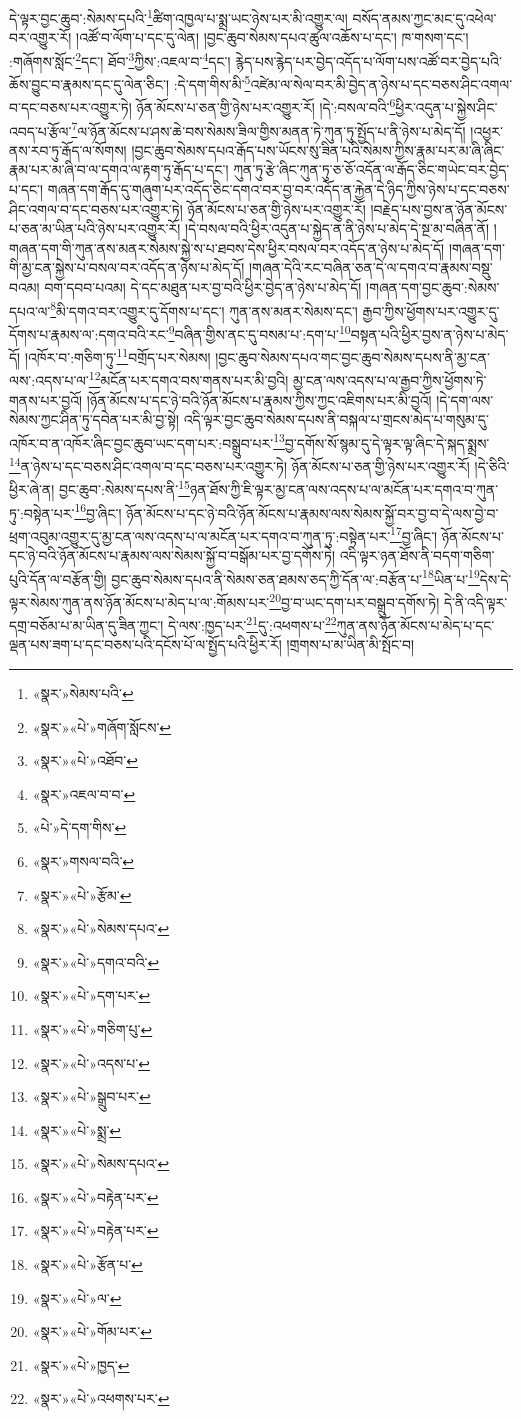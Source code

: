 དེ་ལྟར་བྱང་ཆུབ་:སེམས་དཔའི་\footnote{«སྣར་»སེམས་པའི་}ཚིག་འཁྱལ་པ་སྨྲ་ཡང་ཉེས་པར་མི་འགྱུར་ལ། བསོད་ནམས་ཀྱང་མང་དུ་འཕེལ་བར་འགྱུར་རོ། །འཚོ་བ་ལོག་པ་དང་དུ་ལེན། །བྱང་ཆུབ་སེམས་དཔའ་ཚུལ་འཆོས་པ་དང་། ཁ་གསག་དང་། :གཞོགས་སློང་\footnote{«སྣར་»«པེ་»གཞོག་སློངས་}དང་། ཐོབ་\footnote{«སྣར་»«པེ་»འཐོབ་}ཀྱིས་:འཇལ་བ་\footnote{«སྣར་»འཇལ་བ་བ་}དང་། རྙེད་པས་རྙེད་པར་བྱེད་འདོད་པ་ལོག་པས་འཚོ་བར་བྱེད་པའི་ཆོས་བྱུང་བ་རྣམས་དང་དུ་ལེན་ཅིང་། :དེ་དག་གིས་མི་\footnote{«པེ་»དེ་དག་གིས་}འཛེམ་ལ་སེལ་བར་མི་བྱེད་ན་ཉེས་པ་དང་བཅས་ཤིང་འགལ་བ་དང་བཅས་པར་འགྱུར་ཏེ། ཉོན་མོངས་པ་ཅན་གྱི་ཉེས་པར་འགྱུར་རོ། །དེ་:བསལ་བའི་\footnote{«སྣར་»གསལ་བའི་}ཕྱིར་འདུན་པ་སྐྱེས་ཤིང་འབད་པ་རྩོལ་\footnote{«སྣར་»«པེ་»རྩོམ་}ལ་ཉོན་མོངས་པ་ཤས་ཆེ་བས་སེམས་ཟིལ་གྱིས་མནན་ཏེ་ཀུན་ཏུ་སྤྱོད་པ་ནི་ཉེས་པ་མེད་དོ། །འཕྱར་ནས་རབ་ཏུ་རྒོད་ལ་སོགས། །བྱང་ཆུབ་སེམས་དཔའ་རྒོད་པས་ཡོངས་སུ་ཟིན་པའི་སེམས་ཀྱིས་རྣམ་པར་མ་ཞི་ཞིང་རྣམ་པར་མ་ཞི་བ་ལ་དགའ་ལ་རྟག་ཏུ་རྒོད་པ་དང་། ཀུན་ཏུ་རྩེ་ཞིང་ཀུན་ཏུ་ཅ་ཅོ་འདོན་ལ་རྒོད་ཅིང་གཡེང་བར་བྱེད་པ་དང་། གཞན་དག་རྒོད་དུ་གཞུག་པར་འདོད་ཅིང་དགའ་བར་བྱ་བར་འདོད་ན་རྐྱེན་དེ་ཉིད་ཀྱིས་ཉེས་པ་དང་བཅས་ཤིང་འགལ་བ་དང་བཅས་པར་འགྱུར་ཏེ། ཉོན་མོངས་པ་ཅན་གྱི་ཉེས་པར་འགྱུར་རོ། །བརྗེད་པས་བྱས་ན་ཉོན་མོངས་པ་ཅན་མ་ཡིན་པའི་ཉེས་པར་འགྱུར་རོ། །དེ་བསལ་བའི་ཕྱིར་འདུན་པ་སྐྱེད་ན་ནི་ཉེས་པ་མེད་དེ་སྔ་མ་བཞིན་ནོ། །གཞན་དག་གི་ཀུན་ནས་མནར་སེམས་སྐྱེ་ས་པ་ཐབས་དེས་ཕྱིར་བསལ་བར་འདོད་ན་ཉེས་པ་མེད་དོ། །གཞན་དག་གི་མྱ་ངན་སྐྱེས་པ་བསལ་བར་འདོད་ན་ཉེས་པ་མེད་དོ། །གཞན་དེའི་རང་བཞིན་ཅན་དེ་ལ་དགའ་བ་རྣམས་བསྡུ་བའམ། བག་དབབ་པའམ། དེ་དང་མཐུན་པར་བྱ་བའི་ཕྱིར་བྱེད་ན་ཉེས་པ་མེད་དོ། །གཞན་དག་བྱང་ཆུབ་:སེམས་དཔའ་ལ་\footnote{«སྣར་»«པེ་»སེམས་དཔའ་}མི་དགའ་བར་འགྱུར་དུ་དོགས་པ་དང་། ཀུན་ནས་མནར་སེམས་དང་། རྒྱབ་ཀྱིས་ཕྱོགས་པར་འགྱུར་དུ་དོགས་པ་རྣམས་ལ་:དགའ་བའི་རང་\footnote{«སྣར་»«པེ་»དགའ་བའི་}བཞིན་གྱིས་ནང་དུ་བསམ་པ་:དག་པ་\footnote{«སྣར་»«པེ་»དག་པར་}བསྟན་པའི་ཕྱིར་བྱས་ན་ཉེས་པ་མེད་དོ། །འཁོར་བ་:གཅིག་ཏུ་\footnote{«སྣར་»«པེ་»གཅིག་པུ་}བགྲོད་པར་སེམས། །བྱང་ཆུབ་སེམས་དཔའ་གང་བྱང་ཆུབ་སེམས་དཔས་ནི་མྱ་ངན་ལས་:འདས་པ་ལ་\footnote{«སྣར་»«པེ་»འདས་པ་}མངོན་པར་དགའ་བས་གནས་པར་མི་བྱའི། མྱ་ངན་ལས་འདས་པ་ལ་རྒྱབ་ཀྱིས་ཕྱོགས་ཏེ་གནས་པར་བྱའོ། །ཉོན་མོངས་པ་དང་ཉེ་བའི་ཉོན་མོངས་པ་རྣམས་ཀྱིས་ཀྱང་འཇིགས་པར་མི་བྱའོ། །དེ་དག་ལས་སེམས་ཀྱང་ཤིན་ཏུ་དབེན་པར་མི་བྱ་སྟེ། འདི་ལྟར་བྱང་ཆུབ་སེམས་དཔས་ནི་བསྐལ་པ་གྲངས་མེད་པ་གསུམ་དུ་འཁོར་བ་ན་འཁོར་ཞིང་བྱང་ཆུབ་ཡང་དག་པར་:བསྒྲུབ་པར་\footnote{«སྣར་»«པེ་»སྒྲུབ་པར་}བྱ་དགོས་སོ་སྙམ་དུ་དེ་ལྟར་ལྟ་ཞིང་དེ་སྐད་སྨྲས་\footnote{«སྣར་»«པེ་»སྨྲ་}ན་ཉེས་པ་དང་བཅས་ཤིང་འགལ་བ་དང་བཅས་པར་འགྱུར་ཏེ། ཉོན་མོངས་པ་ཅན་གྱི་ཉེས་པར་འགྱུར་རོ། །དེ་ཅིའི་ཕྱིར་ཞེ་ན། བྱང་ཆུབ་:སེམས་དཔས་ནི་\footnote{«སྣར་»«པེ་»སེམས་དཔའ་}ཉན་ཐོས་ཀྱི་ཇི་ལྟར་མྱ་ངན་ལས་འདས་པ་ལ་མངོན་པར་དགའ་བ་ཀུན་ཏུ་:བསྟེན་པར་\footnote{«སྣར་»«པེ་»བརྟེན་པར་}བྱ་ཞིང་། ཉོན་མོངས་པ་དང་ཉེ་བའི་ཉོན་མོངས་པ་རྣམས་ལས་སེམས་སྐྱོ་བར་བྱ་བ་དེ་ལས་བྱེ་བ་ཕྲག་འབུམ་འགྱུར་དུ་མྱ་ངན་ལས་འདས་པ་ལ་མངོན་པར་དགའ་བ་ཀུན་ཏུ་:བསྟེན་པར་\footnote{«སྣར་»«པེ་»བརྟེན་པར་}བྱ་ཞིང་། ཉོན་མོངས་པ་དང་ཉེ་བའི་ཉོན་མོངས་པ་རྣམས་ལས་སེམས་སྐྱོ་བ་བསྒོམ་པར་བྱ་དགོས་ཏེ། འདི་ལྟར་ཉན་ཐོས་ནི་བདག་གཅིག་པུའི་དོན་ལ་བརྩོན་གྱི། བྱང་ཆུབ་སེམས་དཔའ་ནི་སེམས་ཅན་ཐམས་ཅད་ཀྱི་དོན་ལ་:བརྩོན་པ་\footnote{«སྣར་»«པེ་»རྩོན་པ་}ཡིན་པ་\footnote{«སྣར་»«པེ་»ལ་}དེས་དེ་ལྟར་སེམས་ཀུན་ནས་ཉོན་མོངས་པ་མེད་པ་ལ་:གོམས་པར་\footnote{«སྣར་»«པེ་»གོམ་པར་}བྱ་བ་ཡང་དག་པར་བསྒྲུབ་དགོས་ཏེ། དེ་ནི་འདི་ལྟར་དགྲ་བཅོམ་པ་མ་ཡིན་དུ་ཟིན་ཀྱང་། དེ་ལས་:ཁྱད་པར་\footnote{«སྣར་»«པེ་»ཁྱད་}དུ་:འཕགས་པ་\footnote{«སྣར་»«པེ་»འཕགས་པར་}ཀུན་ནས་ཉོན་མོངས་པ་མེད་པ་དང་ལྡན་པས་ཟག་པ་དང་བཅས་པའི་དངོས་པོ་ལ་སྤྱོད་པའི་ཕྱིར་རོ། །གྲགས་པ་མ་ཡིན་མི་སྤོང་བ། 